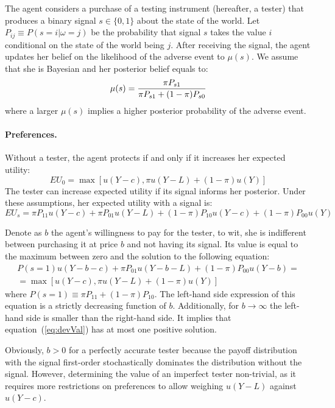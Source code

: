 \documentclass[12pt,a4paper]{article}
\begin{document}
The agent considers a purchase of a testing instrument (hereafter, a tester) that produces a binary signal $s\in\{0,1\}$ about the state of the world. Let $P_{ij}\equiv P(s=i|\omega=j)$ be the probability that signal $s$ takes the value $i$ conditional on the state of the world being $j$.  After receiving the signal, the agent updates her belief on the likelihood of the adverse event to $\mu(s)$. We assume that she is Bayesian and her posterior belief equals to:
\[
\mu(s)= {\pi P_{s1} \over \pi P_{s1}+(1-\pi)P_{s0}}
\]
where a larger $\mu(s)$ implies a higher posterior probability of the adverse event.

\vspace{10pt}
\paragraph{Preferences.} Without a tester, the agent protects if and only if it increases her expected utility:
\[
EU_0=\max[u(Y-c),\pi u(Y-L)+(1-\pi) u(Y)]
\]
The tester can increase expected utility if its signal informs her posterior. Under these assumptions, her expected utility with a signal is:
\[
EU_s=\pi P_{11}u(Y-c)+\pi P_{01}u(Y-L)+(1-\pi)P_{10}u(Y-c)+(1-\pi)P_{00}u(Y)
\]

Denote as $b$ the agent's willingness to pay for the tester, to wit, she is indifferent between purchasing it at price $b$ and not having its signal. Its value is equal to the maximum between zero and the solution to the following equation:
\begin{equation}\label{eq:devVal}
\begin{split}
P(s=1)u(Y-b-c)+\pi P_{01}u(Y-b-L)+(1-\pi)P_{00}u(Y-b)=\\=\max[u(Y-c),\pi u(Y-L)+(1-\pi) u(Y)] 
\end{split}
\end{equation}
where $P(s=1)\equiv \pi P_{11}+(1-\pi)P_{10}$. The left-hand side expression of this equation is a strictly decreasing function of $b$. Additionally, for $b\rightarrow \infty$ the left-hand side is smaller than the right-hand side. It implies that equation~(\ref{eq:devVal}) has at most one positive solution.

Obviously, $b>0$ for a perfectly accurate tester because the payoff distribution with the signal first-order stochastically dominates the distribution without the signal. 
However, determining the value of an imperfect tester non-trivial, as it requires more restrictions on preferences to allow weighing $u(Y-L)$ against $u(Y-c)$.
\end{document}
